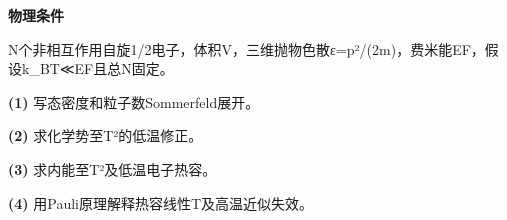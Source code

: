 \textbf{物理条件}\par N个非相互作用自旋1/2电子，体积V，三维抛物色散ε=p²/(2m)，费米能EF，假设k\_BT≪EF且总N固定。
\par\noindent\textbf{(1)} 写态密度和粒子数Sommerfeld展开。
\par\noindent\textbf{(2)} 求化学势至T²的低温修正。
\par\noindent\textbf{(3)} 求内能至T²及低温电子热容。
\par\noindent\textbf{(4)} 用Pauli原理解释热容线性T及高温近似失效。
